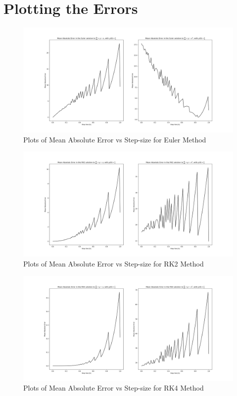 \documentclass{scrartcl}
\begin{document}
\section{Plotting the Errors}
\begin{figure}[h]
    \centering
    \includegraphics[width=\linewidth]{"errors_euler.png"}
    \caption{Plots of Mean Absolute Error vs Step-size for Euler Method}
\end{figure}
\begin{figure}[h]
    \centering
    \includegraphics[width=\linewidth]{"errors_rk2.png"}
    \caption{Plots of Mean Absolute Error vs Step-size for RK2 Method}
\end{figure}
\begin{figure}[h]
    \centering
    \includegraphics[width=\linewidth]{"errors_rk4.png"}
    \caption{Plots of Mean Absolute Error vs Step-size for RK4 Method}
\end{figure}
\end{document}
